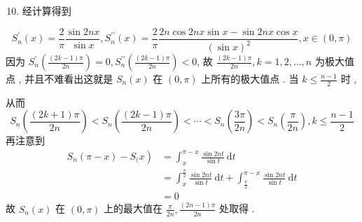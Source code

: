 \documentclass[10pt]{article}
\begin{document}
\begin{enumerate}
  \setcounter{enumi}{9}
  \item  经计算得到 
\end{enumerate}
$$
S_{n}^{\prime}(x)=\frac{2}{\pi} \frac{\sin 2 n x}{\sin x}, S_{n}^{\prime \prime}(x)=\frac{2}{\pi} \frac{2 n \cos 2 n x \sin x-\sin 2 n x \cos x}{(\sin x)^{2}}, x \in(0, \pi)
$$
 因为  $S_{n}^{\prime}\left(\frac{(2 k-1) \pi}{2 n}\right)=0, S_{n}^{\prime \prime}\left(\frac{(2 k-1) \pi}{2 n}\right)<0$,  故  $\frac{(2 k-1) \pi}{2 n}, k=1,2, \ldots, n$  为极大值点 ,  并且不难看出这就是  $S_{n}(x)$  在  $(0, \pi)$  上所有的极大值点 .  当  $k \leqslant \frac{n-1}{2}$  时 ,

 从而 
$$
S_{n}\left(\frac{(2 k+1) \pi}{2 n}\right)<S_{n}\left(\frac{(2 k-1) \pi}{2 n}\right)<\cdots<S_{n}\left(\frac{3 \pi}{2 n}\right)<S_{n}\left(\frac{\pi}{2 n}\right), k \leqslant \frac{n-1}{2}
$$
 再注意到 
$$
\begin{aligned}
\left.S_{n}(\pi-x)-S_{(} x\right) &=\int_{x}^{\pi-x} \frac{\sin 2 n t}{\sin t} \mathrm{~d} t \\
&=\int_{x}^{\frac{\pi}{2}} \frac{\sin 2 n t}{\sin t} \mathrm{~d} t+\int_{\frac{\pi}{2}}^{\pi-x} \frac{\sin 2 n t}{\sin t} \mathrm{~d} t \\
&=0
\end{aligned}
$$
 故  $S_{n}(x)$  在  $(0, \pi)$  上的最大值在  $\frac{\pi}{2 n}, \frac{(2 n-1) \pi}{2 n}$  处取得 .
\end{document}
